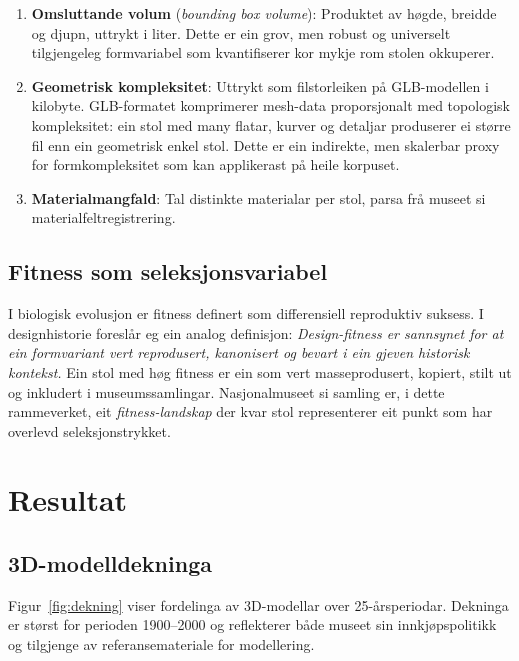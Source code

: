 \documentclass[12pt,a4paper]{article}
\begin{document}
\begin{enumerate}
    \item \textbf{Omsluttande volum} (\emph{bounding box volume}): Produktet av h\o{}gde, breidde og djupn, uttrykt i liter. Dette er ein grov, men robust og universelt tilgjengeleg formvariabel som kvantifiserer kor mykje rom stolen okkuperer.
    \item \textbf{Geometrisk kompleksitet}: Uttrykt som filstorleiken p\aa{} GLB-modellen i kilobyte. GLB-formatet komprimerer mesh-data proporsjonalt med topologisk kompleksitet: ein stol med many flatar, kurver og detaljar produserer ei st\o{}rre fil enn ein geometrisk enkel stol. Dette er ein indirekte, men skalerbar proxy for formkompleksitet som kan applikerast p\aa{} heile korpuset.
    \item \textbf{Materialmangfald}: Tal distinkte materialar per stol, parsa fr\aa{} museet si materialfeltregistrering.
\end{enumerate}

\subsection{Fitness som seleksjonsvariabel}

I biologisk evolusjon er fitness definert som differensiell reproduktiv suksess. I designhistorie foresl\aa{}r eg ein analog definisjon: \emph{Design-fitness er sannsynet for at ein formvariant vert reprodusert, kanonisert og bevart i ein gjeven historisk kontekst.} Ein stol med h\o{}g fitness er ein som vert masseprodusert, kopiert, stilt ut og inkludert i museumssamlingar. Nasjonalmuseet si samling er, i dette rammeverket, eit \emph{fitness-landskap} der kvar stol representerer eit punkt som har overlevd seleksjonstrykket.

\section{Resultat}

\subsection{3D-modelldekninga}

Figur~\ref{fig:dekning} viser fordelinga av 3D-modellar over 25-\aa{}rsperiodar. Dekninga er st\o{}rst for perioden 1900--2000 og reflekterer b\aa{}de museet sin innkj\o{}pspolitikk og tilgjenge av referansemateriale for modellering.
\end{document}
